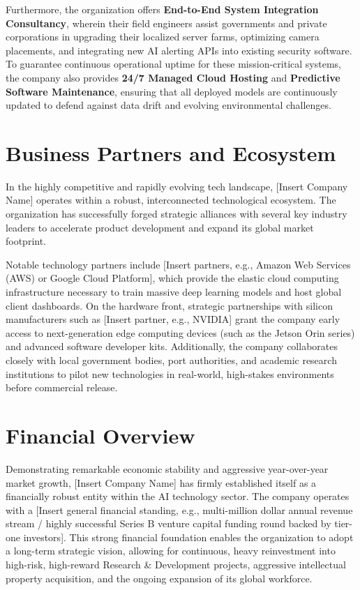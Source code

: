 Furthermore, the organization offers \textbf{End-to-End System Integration Consultancy}, wherein their field engineers assist governments and private corporations in upgrading their localized server farms, optimizing camera placements, and integrating new AI alerting APIs into existing security software. To guarantee continuous operational uptime for these mission-critical systems, the company also provides \textbf{24/7 Managed Cloud Hosting} and \textbf{Predictive Software Maintenance}, ensuring that all deployed models are continuously updated to defend against data drift and evolving environmental challenges.

\section{Business Partners and Ecosystem}
In the highly competitive and rapidly evolving tech landscape, [Insert Company Name] operates within a robust, interconnected technological ecosystem. The organization has successfully forged strategic alliances with several key industry leaders to accelerate product development and expand its global market footprint. 

Notable technology partners include [Insert partners, e.g., Amazon Web Services (AWS) or Google Cloud Platform], which provide the elastic cloud computing infrastructure necessary to train massive deep learning models and host global client dashboards. On the hardware front, strategic partnerships with silicon manufacturers such as [Insert partner, e.g., NVIDIA] grant the company early access to next-generation edge computing devices (such as the Jetson Orin series) and advanced software developer kits. Additionally, the company collaborates closely with local government bodies, port authorities, and academic research institutions to pilot new technologies in real-world, high-stakes environments before commercial release.

\section{Financial Overview}
Demonstrating remarkable economic stability and aggressive year-over-year market growth, [Insert Company Name] has firmly established itself as a financially robust entity within the AI technology sector. The company operates with a [Insert general financial standing, e.g., multi-million dollar annual revenue stream / highly successful Series B venture capital funding round backed by tier-one investors]. This strong financial foundation enables the organization to adopt a long-term strategic vision, allowing for continuous, heavy reinvestment into high-risk, high-reward Research \& Development projects, aggressive intellectual property acquisition, and the ongoing expansion of its global workforce.

